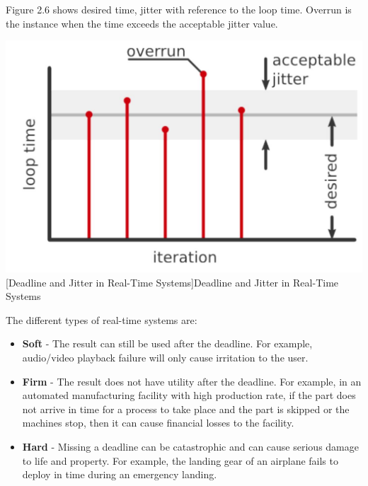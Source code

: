 \documentclass[%
xelatex,
	oneside,		%
	12pt,			%
	parskip=half,	%
	abstracton,
	chapterprefix=true%
    appendixprefix=true]
{scrbook}
\begin{document}
	
Figure 2.6 shows desired time, jitter with reference to the loop time. Overrun is the instance when the time exceeds the acceptable jitter value.
	\begin{center}
\includegraphics[scale=0.5]{fig/deadline.jpg}
[Deadline and Jitter in Real-Time Systems]{Deadline and Jitter in Real-Time Systems \cite{deadline}}
\label{fig:deadline}
\end{center}
	The different types of real-time systems are:
	\begin{itemize}
\item	{\bfseries Soft} - The result can still be used after the deadline. For example, audio/video playback failure will only cause irritation to the user.
\item	{\bfseries	Firm} - The result does not have utility after the deadline. For example, in an automated manufacturing facility with high production rate, if the part does not arrive in time for a process to take place and the part is skipped or the machines stop, then it can cause financial losses to the facility.
\item	{\bfseries	Hard} - Missing a deadline can be catastrophic and can cause serious damage to life and property. For example, the landing gear of an airplane fails to deploy in time during an emergency landing.
	\end{itemize}
	\clearpage
	
\end{document}

